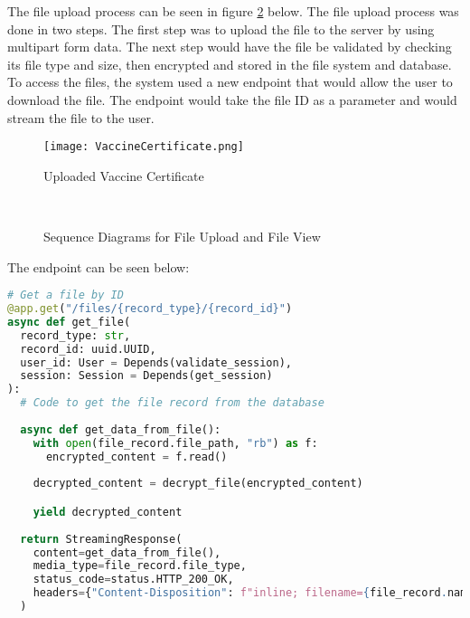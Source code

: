 The file upload process can be seen in figure \ref{fig:fileuploadview} below. The file upload process was done in two steps. The first step was to upload the file to the server by using multipart form data. The next step would have the file be validated by checking its file type and size, then encrypted and stored in the file system and database. To access the files, the system used a new endpoint that would allow the user to download the file. The endpoint would take the file ID as a parameter and would stream the file to the user.

\begin{figure}[htbp]
  \centering
  \texttt{[image: VaccineCertificate.png]}
  \caption{Uploaded Vaccine Certificate}
  \label{fig:vaccinecertificate}
\end{figure}

\FloatBarrier

\begin{figure}[ht]
  \centering
  \\
  \caption{Sequence Diagrams for File Upload and File View}
  \label{fig:fileuploadview}
\end{figure}

\FloatBarrier

The endpoint can be seen below:

\begin{lstlisting}[language=Python, caption=File Download Endpoint]
# Get a file by ID
@app.get("/files/{record_type}/{record_id}")
async def get_file(
  record_type: str,
  record_id: uuid.UUID,
  user_id: User = Depends(validate_session),
  session: Session = Depends(get_session)    
):    
  # Code to get the file record from the database
  
  async def get_data_from_file():
    with open(file_record.file_path, "rb") as f:
      encrypted_content = f.read()
      
    decrypted_content = decrypt_file(encrypted_content)

    yield decrypted_content
    
  return StreamingResponse(
    content=get_data_from_file(),
    media_type=file_record.file_type,
    status_code=status.HTTP_200_OK,
    headers={"Content-Disposition": f"inline; filename={file_record.name}"}
  )
\end{lstlisting}

